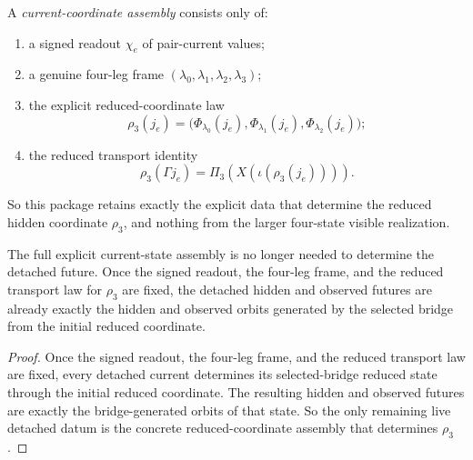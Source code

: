 \begin{definition}
\label{def:current-coordinate-assembly}
A \emph{current-coordinate assembly} consists only of:
\begin{enumerate}
\item a signed readout \(\chi_e\) of pair-current values;
\item a genuine four-leg frame
      \((\lambda_0,\lambda_1,\lambda_2,\lambda_3)\);
\item the explicit reduced-coordinate law
\[
\rho_3(j_e)
=
\bigl(
\Phi_{\lambda_0}(j_e),
\Phi_{\lambda_1}(j_e),
\Phi_{\lambda_2}(j_e)
\bigr);
\]
\item the reduced transport identity
\[
\rho_3(\Gamma j_e)=\Pi_3(X(\iota(\rho_3(j_e)))).
\]
\end{enumerate}
So this package retains exactly the explicit data that determine the reduced
hidden coordinate \(\rho_3\), and nothing from the larger four-state visible
realization.
\end{definition}

\begin{corollary}
\label{thm:the-detached-future-already-depends-only-on-the-coordinate-assembly-and-the-selected-bridge}
The full explicit current-state assembly is no longer needed to determine the
detached future. Once the signed readout, the four-leg frame, and the reduced
transport law for \(\rho_3\) are fixed, the detached hidden and observed
futures are already exactly the hidden and observed orbits generated by the
selected bridge from the initial reduced coordinate.
\end{corollary}

\begin{proof}
Once the signed readout, the four-leg frame, and the reduced transport law are
fixed, every detached current determines its selected-bridge reduced state
through the initial reduced coordinate. The resulting hidden and observed
futures are exactly the bridge-generated orbits of that state. So the only
remaining live detached datum is the concrete reduced-coordinate assembly that
determines \(\rho_3\).
\end{proof}

